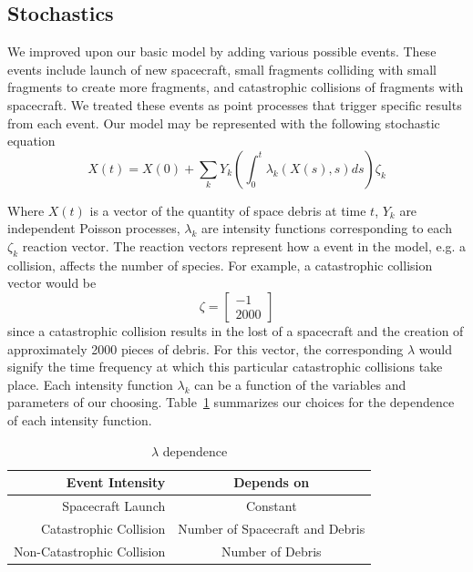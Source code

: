 \documentclass[pre,12pt]{revtex4-1}
\begin{document}
\subsection{Stochastics}
We improved upon our basic model by adding various possible events. These events include launch of new spacecraft, small fragments colliding with small fragments to create more fragments, and catastrophic collisions of fragments with spacecraft. We treated these events as point processes that trigger specific results from each event.
Our model may be represented with the following stochastic equation
\begin{equation}
	X(t) = X(0) + \sum_k Y_k \left(\int_0^t \lambda_k(X(s),s)ds\right) \zeta_k
\end{equation}

Where $X(t)$ is a vector of the quantity of space debris at time $t$, $Y_k$ are independent Poisson processes, $\lambda_k$ are intensity functions corresponding to each $\zeta_k$ reaction vector. The reaction vectors represent how a event in the model, e.g. a collision, affects the number of species. For example, a catastrophic collision vector would be
\begin{equation}
	\zeta = \begin{bmatrix} -1 \\ 2000 \end{bmatrix}
\end{equation}
since a catastrophic collision results in the lost of a spacecraft and the creation of approximately 2000 pieces of debris. For this vector, the corresponding $\lambda$ would signify the time frequency at which this particular catastrophic collisions take place. Each intensity function $\lambda_k$ can be a function of the variables and parameters of our choosing. Table~\ref{tab:lambdas} summarizes our choices for the dependence of each intensity function.

\begin{table}[h]
\centering
\begin{tabular}{r | c}
	Event Intensity & Depends on \\ \hline
	Spacecraft Launch & Constant \\ \hline
	Catastrophic Collision & Number of Spacecraft and Debris \\ \hline
	Non-Catastrophic Collision & Number of Debris \\ \hline
\end{tabular}
\caption{$\lambda$ dependence}
\label{tab:lambdas}
\end{table}
\end{document}
